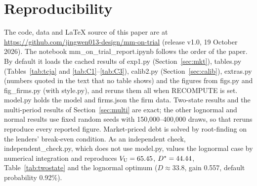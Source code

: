 \newpage
\section{Reproducibility}\label{app:D}

The code, data and \LaTeX{} source of this paper are at \url{https://github.com/jingwen013-design/mm-on-trial} (release v1.0, 19 October 2026). The notebook mm\_on\_trial\_report.ipynb follows the order of the paper. By default it loads the cached results of exp1.py (Section~\ref{sec:mkt}), tables.py (Tables~\ref{tab:tcja} and \ref{tab:C1}--\ref{tab:C3}), calib2.py (Section~\ref{sec:calib}), extras.py (numbers quoted in the text that no table shows) and the figures from figs.py and fig\_firms.py (with style.py), and reruns them all when RECOMPUTE is set. model.py holds the model and firms.json the firm data. Two-state results and the multi-period results of Section~\ref{sec:multi} are exact; the other lognormal and normal results use fixed random seeds with 150,000--400,000 draws, so that reruns reproduce every reported figure. Market-priced debt is solved by root-finding on the lenders' break-even condition. As an independent check, independent\_check.py, which does not use model.py, values the lognormal case by numerical integration and reproduces $V_{\mathrm{U}} = 65.45$, $D^{*} = 44.44$, Table~\ref{tab:twostate} and the lognormal optimum ($D \approx 33.8$, gain 0.557, default probability 0.92\%).
